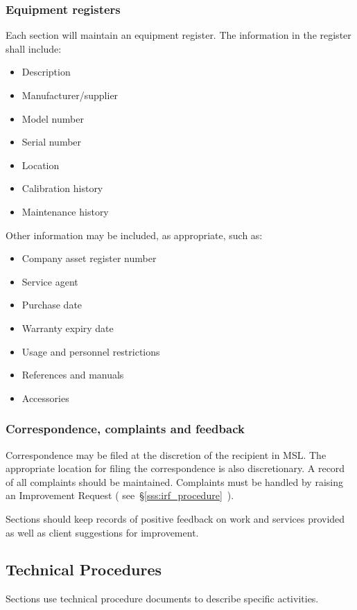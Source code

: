 \subsubsection{Equipment registers}
\label{sss:equipment_register}
Each section will maintain an equipment register. The information in the register shall include: 
\begin{itemize}
\item Description 

\item Manufacturer/supplier 
\item Model number 
\item Serial number 
\item Location
\item Calibration history 
\item Maintenance history
\end{itemize}
Other information may be included, as appropriate, such as:
\begin{itemize}\item Company asset register number 
\item Service agent 
\item Purchase date 
\item Warranty expiry date 
\item Usage and personnel restrictions
\item References and manuals
\item Accessories
\end{itemize}

\subsubsection{Correspondence, complaints and feedback}
Correspondence may be filed at the discretion of the recipient in MSL. The appropriate location for filing the correspondence is also discretionary. 
A record of all complaints should be maintained. Complaints must be handled by raising an Improvement Request ( see~\S\ref{sss:irf_procedure}~).

Sections should keep records of positive feedback on work and services provided as well as client suggestions for improvement.

\subsection{Technical Procedures}
\label{ss:technical_procedures}
Sections use technical procedure documents to describe specific activities.

